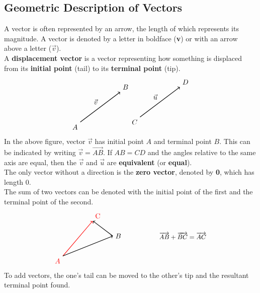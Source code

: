 \documentclass[../Calculus_\Roman{3}]{subfiles}
\begin{document}
			\subsection*{Geometric Description of Vectors}
				A vector is often represented by an arrow, the length of which represents its magnitude. A vector is denoted by a letter in boldface (\textbf{v}) or with an arrow above a letter ($\vec{v}$). \\
				A \textbf{displacement vector} is a vector representing how something is displaced from its \textbf{initial point} (tail) to its \textbf{terminal point} (tip).
				\[\begin{tikzpicture}
					\draw[thick, ->] (0, 0) node[anchor = north east]{$A$} -- node[anchor = south east]{$\vec{v}$} ++ (2, 1.5) node[anchor = south west]{$B$};
					\draw[thick, ->] (3, 0.25) node[anchor = north east]{$C$} -- node[anchor = south east]{$\vec{u}$} ++ (2, 1.5) node[anchor = south west]{$D$};
				\end{tikzpicture}\]
				In the above figure, vector $\vec{v}$ has initial point $A$ and terminal point $B$. This can be indicated by writing $\vec{v} = \Vec{AB}$. If $AB = CD$ and the angles relative to the same axis are equal, then the $\vec{v}$ and $\vec{u}$ are \textbf{equivalent} (or \textbf{equal}). \\
				The only vector without a direction is the \textbf{zero vector}, denoted by \textbf{0}, which has length 0. \\
				The sum of two vectors can be denoted with the initial point of the first and the terminal point of the second. \\
				\[\begin{tikzpicture}
					\draw[thick, ->, color = red] (0, 0) node[anchor = north east]{$A$} -- (1.49, 1.75) node[anchor = south west]{C};
					\draw[thick, ->] (0, 0) -- (2.5, 1) node[anchor = west]{$B$};
					\draw[thick, ->] (2.5, 1) -- (1.51, 1.75);
					\node[] at (6, 1){\small$\Vec{AB} + \Vec{BC} = \Vec{AC}$};
				\end{tikzpicture}\]
				To add vectors, the one's tail can be moved to the other's tip and the resultant terminal point found.
\end{document}
